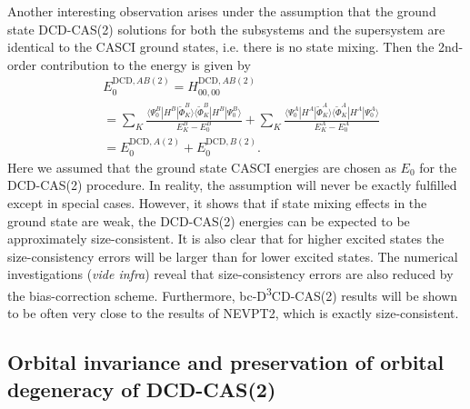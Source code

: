 Another interesting observation arises under the assumption that the ground state DCD-CAS(2) solutions for both the subsystems and the supersystem are identical to the CASCI ground states, i.e. there is no state mixing. Then the 2nd-order contribution to the energy is given by
\begin{equation}
\begin{aligned}
&E_0^{\text{DCD}, AB(2)} = H_{00, 00}^{\text{DCD}, AB(2)} \\
&= \sum_K \frac{\langle \Psi_0^B | H^B | \tilde \Phi_K^B\rangle \langle \tilde \Phi_K^B| H^B | \Psi_0^B\rangle}{E_K^B - E_0^B} + \sum_K \frac{\langle \Psi_0^A | H^A | \tilde \Phi_K^A\rangle \langle \tilde \Phi_K^A| H^A | \Psi_0^A\rangle}{E_K^A - E_0^A} \\
&= E_0^{\text{DCD}, A(2)} + E_0^{\text{DCD}, B(2)}.
\end{aligned}
\end{equation}
Here we assumed that the ground state CASCI energies are chosen as $E_0$ for the DCD-CAS(2) procedure. In reality, the assumption will never be exactly fulfilled except in special cases. However, it shows that if state mixing effects in the ground state are weak, the DCD-CAS(2) energies can be expected to be approximately size-consistent. It is also clear that for higher excited states the size-consistency errors will be larger than for lower excited states. The numerical investigations (\textit{vide infra}) reveal that size-consistency errors are also reduced by the bias-correction scheme. Furthermore, bc-D\textsuperscript{3}CD-CAS(2) results will be shown to be often very close to the results of NEVPT2, which is exactly size-consistent.

\subsection{Orbital invariance and preservation of orbital degeneracy of DCD-CAS(2)}
